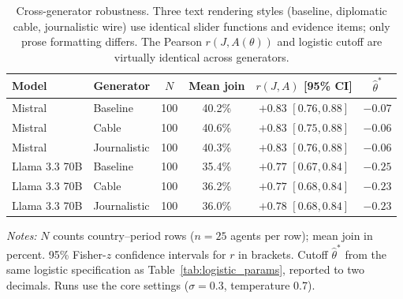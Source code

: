 \begin{table}[t]
\centering
\caption{Cross-generator robustness. Three text rendering styles (baseline, diplomatic cable, journalistic wire) use identical slider functions and evidence items; only prose formatting differs. The Pearson $r(J, A(\theta))$ and logistic cutoff are virtually identical across generators.}
\label{tab:cross_generator}
\scriptsize
\setlength{\tabcolsep}{1.5pt}
\begin{tabular}{llcccc}
\toprule
Model & Generator & $N$ & Mean join & $r(J,A)$ [95\% CI] & $\hat{\theta}^*$ \\
\midrule
Mistral & Baseline & 100 & 40.2\% & $+0.83$ {\scriptsize $[0.76,0.88]$} & $-0.07$ \\
Mistral & Cable & 100 & 40.6\% & $+0.83$ {\scriptsize $[0.75,0.88]$} & $-0.06$ \\
Mistral & Journalistic & 100 & 40.3\% & $+0.83$ {\scriptsize $[0.76,0.88]$} & $-0.06$ \\
\midrule
Llama 3.3 70B & Baseline & 100 & 35.4\% & $+0.77$ {\scriptsize $[0.67,0.84]$} & $-0.25$ \\
Llama 3.3 70B & Cable & 100 & 36.2\% & $+0.77$ {\scriptsize $[0.68,0.84]$} & $-0.23$ \\
Llama 3.3 70B & Journalistic & 100 & 36.0\% & $+0.78$ {\scriptsize $[0.68,0.84]$} & $-0.23$ \\
\bottomrule
\end{tabular}
\begin{tablenotes}
\footnotesize\emph{Notes:} $N$ counts country--period rows ($n = 25$ agents per row); mean join in percent. 95\% Fisher-$z$ confidence intervals for $r$ in brackets. Cutoff $\hat{\theta}^*$ from the same logistic specification as Table~\ref{tab:logistic_params}, reported to two decimals. Runs use the core settings ($\sigma = 0.3$, temperature 0.7).
\end{tablenotes}
\end{table}
